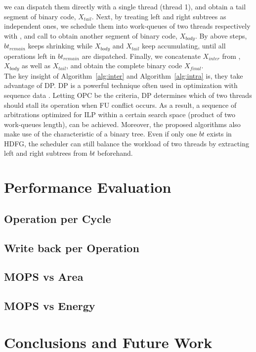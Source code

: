\documentclass[12pt]{article}
\begin{document}
\begin{CJK}{UTF8}{bkai}
        we can dispatch them directly with a single thread (thread 1), 
        and obtain a tail segment of binary code, $X_{tail}$.
        Next, by treating left and right subtrees as independent ones, 
        we schedule them into work-queues of two threads respectively with ,
        and call  to obtain another segment of binary code, $X_{body}$.
        By above steps, $bt_{remain}$ keeps shrinking while $X_{body}$ and $X_{tail}$ keep accumulating,
        until all operations left in $bt_{remain}$ are dispatched.
        Finally, we concatenate $X_{inter}$ from , $X_{body}$ as well as $X_{tail}$,
        and obtain the complete binary code $X_{final}$.
        \\\indent
        The key insight of Algorithm~\ref{alg:inter} and Algorithm~\ref{alg:intra} is, they take advantage of DP.
        DP is a powerful technique often used in optimization with sequence data \cite{dpseq}.
        Letting OPC be the criteria, DP determines which of two threads should stall its operation when FU conflict occurs.
        As a result, a sequence of arbitrations optimized for ILP within a certain search space (product of two work-queues length), can be achieved.
        Moreover, the proposed algorithms also make use of the characteristic of a binary tree. 
        Even if only one $bt$ exists in HDFG, 
        the scheduler can still balance the workload of two threads by extracting left and right subtrees from $bt$ beforehand.

\section{Performance Evaluation}
    \subsection{Operation per Cycle}
    \subsection{Write back per Operation}
    \subsection{MOPS vs Area}
    \subsection{MOPS vs Energy}

\section{Conclusions and Future Work}

\clearpage

\singlespacing

\printbibliography

\end{CJK}
\end{document}
